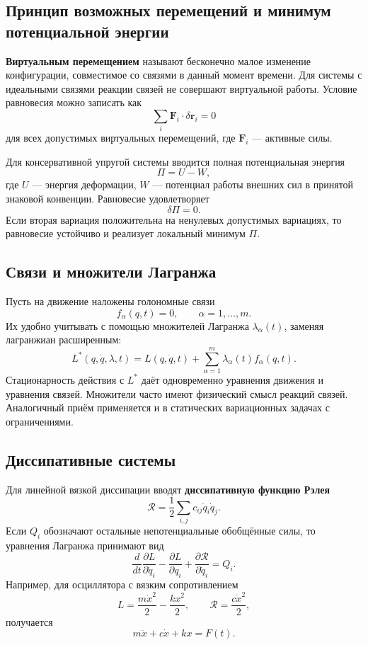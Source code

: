 \subsection{Принцип возможных перемещений и минимум потенциальной энергии}

\textbf{Виртуальным перемещением} называют бесконечно малое изменение
конфигурации, совместимое со связями в данный момент времени. Для системы
с идеальными связями реакции связей не совершают виртуальной работы.
Условие равновесия можно записать как
\[
\boxed{\sum_i \mathbf F_i\cdot\delta\mathbf r_i=0}
\]
для всех допустимых виртуальных перемещений, где $\mathbf F_i$ --- активные
силы.

Для консервативной упругой системы вводится полная потенциальная энергия
\[
\boxed{\Pi=U-W},
\]
где $U$ --- энергия деформации, $W$ --- потенциал работы внешних сил в
принятой знаковой конвенции. Равновесие удовлетворяет
\[
\delta\Pi=0.
\]
Если вторая вариация положительна на ненулевых допустимых вариациях, то
равновесие устойчиво и реализует локальный минимум $\Pi$.

\subsection{Связи и множители Лагранжа}

Пусть на движение наложены голономные связи
\[
f_\alpha(q,t)=0,\qquad \alpha=1,\ldots,m.
\]
Их удобно учитывать с помощью множителей Лагранжа $\lambda_\alpha(t)$,
заменяя лагранжиан расширенным:
\[
L^*(q,\dot q,\lambda,t)
=L(q,\dot q,t)
+\sum_{\alpha=1}^m\lambda_\alpha(t)f_\alpha(q,t).
\]
Стационарность действия с $L^*$ даёт одновременно уравнения движения и
уравнения связей. Множители часто имеют физический смысл реакций связей.
Аналогичный приём применяется и в статических вариационных задачах с
ограничениями.

\subsection{Диссипативные системы}

Для линейной вязкой диссипации вводят \textbf{диссипативную функцию Рэлея}
\[
\mathcal R=\frac12\sum_{i,j}c_{ij}\dot q_i\dot q_j.
\]
Если $Q_i$ обозначают остальные непотенциальные обобщённые силы, то
уравнения Лагранжа принимают вид
\[
\boxed{
\frac{d}{dt}\frac{\partial L}{\partial\dot q_i}
-\frac{\partial L}{\partial q_i}
+\frac{\partial\mathcal R}{\partial\dot q_i}
=Q_i.
}
\]
Например, для осциллятора с вязким сопротивлением
\[
L=\frac{m\dot x^2}{2}-\frac{kx^2}{2},
\qquad \mathcal R=\frac{c\dot x^2}{2},
\]
получается
\[
m\ddot x+c\dot x+kx=F(t).
\]

